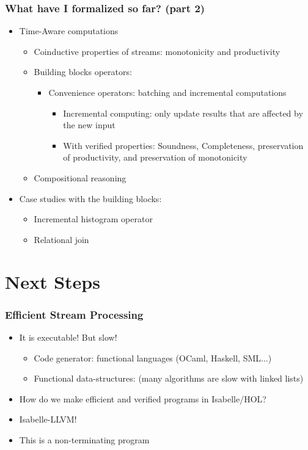 \documentclass[aspectratio=169,10pt]{beamer}
\begin{document}
\begin{frame}[fragile]
  \frametitle{What have I formalized so far?  (part 2)}
  \begin{itemize}
    \item Time-Aware computations
          \begin{itemize}
            \item Coinductive properties of streams: monotonicity and productivity
            \item Building blocks operators:
                  \begin{itemize}
                    \item Convenience operators: batching and incremental computations
                          \begin{itemize}
                            \item Incremental computing: only update results that are affected by the new input
                            \item With verified properties: Soundness, Completeness, preservation of productivity, and preservation of monotonicity
                          \end{itemize}
                  \end{itemize}
            \item Compositional reasoning
          \end{itemize}
    \item Case studies with the building blocks:
          \begin{itemize}
            \item Incremental histogram operator
            \item Relational join
          \end{itemize}
  \end{itemize}
\end{frame}

\section{Next Steps}

\begin{frame}[fragile]
  \frametitle{Efficient Stream Processing}
  \begin{itemize}
    \item It is executable! But slow!
          \begin{itemize}
            \item Code generator: functional languages (OCaml, Haskell, SML...)
            \item Functional data-structures: (many algorithms are slow with linked lists)
          \end{itemize}
    \pause
    \item How do we make efficient and verified programs in Isabelle/HOL?
          \pause
          \item Isabelle-LLVM!
    \item This is a non-terminating program
    \end{itemize}
\end{frame}
\end{document}
